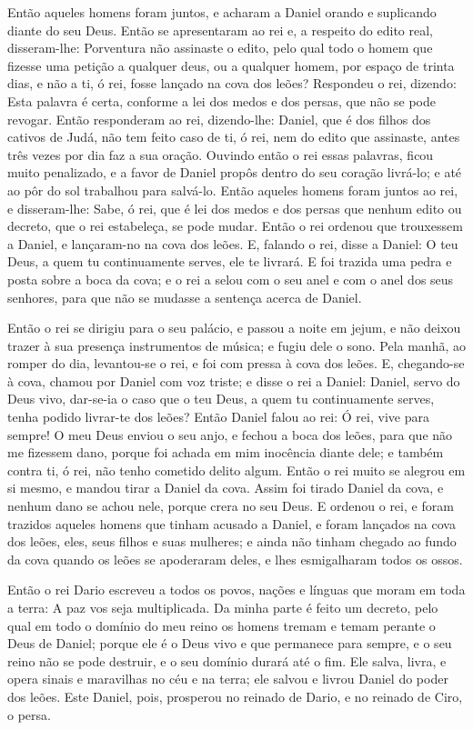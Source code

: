 Então aqueles homens foram juntos, e acharam a Daniel orando e
suplicando diante do seu Deus. Então se apresentaram ao rei
e, a respeito do edito real, disseram-lhe: Porventura não assinaste
o edito, pelo qual todo o homem que fizesse uma petição a qualquer
deus, ou a qualquer homem, por espaço de trinta dias, e não a ti, ó
rei, fosse lançado na cova dos leões? Respondeu o rei, dizendo: Esta
palavra é certa, conforme a lei dos medos e dos persas, que não se
pode revogar. Então responderam ao rei, dizendo-lhe: Daniel,
que é dos filhos dos cativos de Judá, não tem feito caso de ti, ó
rei, nem do edito que assinaste, antes três vezes por dia faz a sua
oração. Ouvindo então o rei essas palavras, ficou muito
penalizado, e a favor de Daniel propôs dentro do seu coração
livrá-lo; e até ao pôr do sol trabalhou para salvá-lo. Então
aqueles homens foram juntos ao rei, e disseram-lhe: Sabe, ó rei, que
é lei dos medos e dos persas que nenhum edito ou decreto, que o rei
estabeleça, se pode mudar. Então o rei ordenou que trouxessem
a Daniel, e lançaram-no na cova dos leões. E, falando o rei, disse a
Daniel: O teu Deus, a quem tu continuamente serves, ele te livrará.
E foi trazida uma pedra e posta sobre a boca da cova; e o rei
a selou com o seu anel e com o anel dos seus senhores, para que não
se mudasse a sentença acerca de Daniel.

Então o rei se dirigiu para o seu palácio, e passou a noite em
jejum, e não deixou trazer à sua presença instrumentos de música; e
fugiu dele o sono. Pela manhã, ao romper do dia, levantou-se
o rei, e foi com pressa à cova dos leões. E, chegando-se à
cova, chamou por Daniel com voz triste; e disse o rei a Daniel:
Daniel, servo do Deus vivo, dar-se-ia o caso que o teu Deus, a quem
tu continuamente serves, tenha podido livrar-te dos leões?
Então Daniel falou ao rei: Ó rei, vive para sempre! O
meu Deus enviou o seu anjo, e fechou a boca dos leões, para que não
me fizessem dano, porque foi achada em mim inocência diante dele; e
também contra ti, ó rei, não tenho cometido delito algum.
Então o rei muito se alegrou em si mesmo, e mandou tirar a
Daniel da cova. Assim foi tirado Daniel da cova, e nenhum dano se
achou nele, porque crera no seu Deus. E ordenou o rei, e
foram trazidos aqueles homens que tinham acusado a Daniel, e foram
lançados na cova dos leões, eles, seus filhos e suas mulheres; e
ainda não tinham chegado ao fundo da cova quando os leões se
apoderaram deles, e lhes esmigalharam todos os ossos.

Então o rei Dario escreveu a todos os povos, nações e línguas que
moram em toda a terra: A paz vos seja multiplicada. Da minha
parte é feito um decreto, pelo qual em todo o domínio do meu reino
os homens tremam e temam perante o Deus de Daniel; porque ele é o
Deus vivo e que permanece para sempre, e o seu reino não se pode
destruir, e o seu domínio durará até o fim. Ele salva, livra,
e opera sinais e maravilhas no céu e na terra; ele salvou e livrou
Daniel do poder dos leões. Este Daniel, pois, prosperou no
reinado de Dario, e no reinado de Ciro, o persa.

